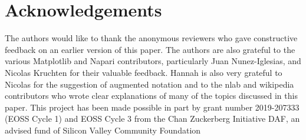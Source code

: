 \documentclass{vgtc}
\begin{document}
\section*{Acknowledgements}
The authors would like to thank the anonymous reviewers who gave constructive feedback on an earlier version of this paper. The authors are also grateful to  the various Matplotlib and Napari contributors, particularly Juan Nunez-Iglesias, and Nicolas Kruchten for their valuable feedback. Hannah is also very grateful to Nicolas for the suggestion of augmented notation and to the nlab and wikipedia contributors who wrote clear explanations of many of the topics discussed in this paper. This project has been made possible in part by grant number 2019-207333 (EOSS Cycle 1) and EOSS Cycle 3 from the Chan Zuckerberg Initiative DAF, an advised fund of Silicon Valley Community Foundation




\end{document}
